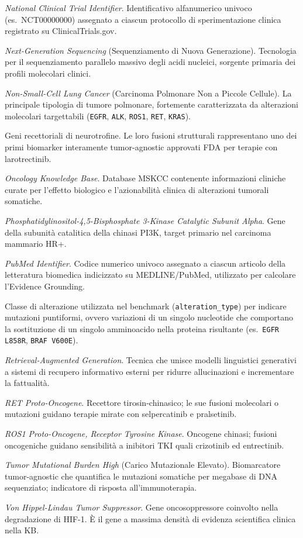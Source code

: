 \documentclass[11pt,a4paper]{article}
\newcommand{\code}[1]{\texttt{\small #1}}
\begin{document}
\begin{description}[leftmargin=1.4em,style=nextline]
\item[NCT ID] \emph{National Clinical Trial Identifier}. Identificativo alfanumerico univoco (es.\ NCT00000000) assegnato a ciascun protocollo di sperimentazione clinica registrato su ClinicalTrials.gov.
\item[NGS] \emph{Next-Generation Sequencing} (Sequenziamento di Nuova Generazione). Tecnologia per il sequenziamento parallelo massivo degli acidi nucleici, sorgente primaria dei profili molecolari clinici.
\item[NSCLC] \emph{Non-Small-Cell Lung Cancer} (Carcinoma Polmonare Non a Piccole Cellule). La principale tipologia di tumore polmonare, fortemente caratterizzata da alterazioni molecolari targettabili (\code{EGFR}, \code{ALK}, \code{ROS1}, \code{RET}, \code{KRAS}).
\item[NTRK1 / NTRK2 / NTRK3] Geni recettoriali di neurotrofine. Le loro fusioni strutturali rappresentano uno dei primi biomarker interamente tumor-agnostic approvati FDA per terapie con larotrectinib.
\item[OncoKB] \emph{Oncology Knowledge Base}. Database MSKCC contenente informazioni cliniche curate per l'effetto biologico e l'azionabilità clinica di alterazioni tumorali somatiche.
\item[PIK3CA] \emph{Phosphatidylinositol-4,5-Bisphosphate 3-Kinase Catalytic Subunit Alpha}. Gene della subunità catalitica della chinasi PI3K, target primario nel carcinoma mammario HR+.
\item[PMID] \emph{PubMed Identifier}. Codice numerico univoco assegnato a ciascun articolo della letteratura biomedica indicizzato su MEDLINE/PubMed, utilizzato per calcolare l'Evidence Grounding.
\item[point\_mutation] Classe di alterazione utilizzata nel benchmark (\code{alteration\_type}) per indicare mutazioni puntiformi, ovvero variazioni di un singolo nucleotide che comportano la sostituzione di un singolo amminoacido nella proteina risultante (es.\ \code{EGFR L858R}, \code{BRAF V600E}).
\item[RAG] \emph{Retrieval-Augmented Generation}. Tecnica che unisce modelli linguistici generativi a sistemi di recupero informativo esterni per ridurre allucinazioni e incrementare la fattualità.
\item[RET] \emph{RET Proto-Oncogene}. Recettore tirosin-chinasico; le sue fusioni molecolari o mutazioni guidano terapie mirate con selpercatinib e pralsetinib.
\item[ROS1] \emph{ROS1 Proto-Oncogene, Receptor Tyrosine Kinase}. Oncogene chinasi; fusioni oncogeniche guidano sensibilità a inibitori TKI quali crizotinib ed entrectinib.
\item[TMB-High / TMB-H] \emph{Tumor Mutational Burden High} (Carico Mutazionale Elevato). Biomarcatore tumor-agnostic che quantifica le mutazioni somatiche per megabase di DNA sequenziato; indicatore di risposta all'immunoterapia.
\item[VHL] \emph{Von Hippel-Lindau Tumor Suppressor}. Gene oncosoppressore coinvolto nella degradazione di HIF-1. È il gene a massima densità di evidenza scientifica clinica nella KB.
\end{description}
\end{document}
